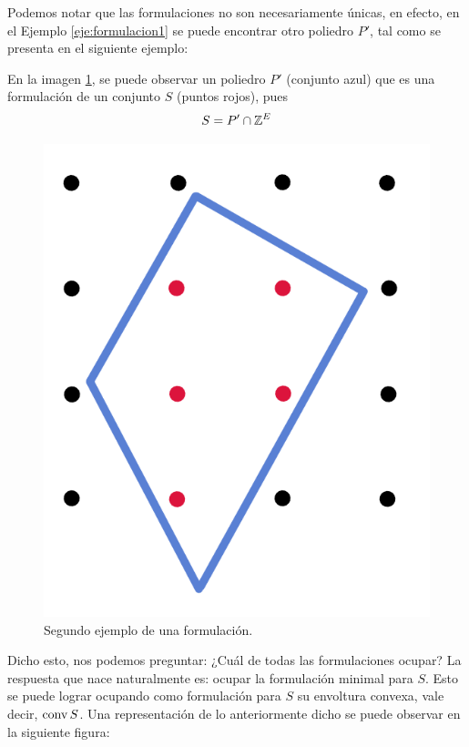 Podemos notar que las formulaciones no son necesariamente únicas, en efecto, en el Ejemplo \ref{eje:formulacion1} se puede encontrar otro poliedro $P'$, tal como se presenta en el siguiente ejemplo:

\begin{eje} \label{eje:formulacion2}
En la imagen \ref{fig:formulacion2}, se puede observar un poliedro $P'$ (conjunto azul) que es una formulación de un conjunto $S$ (puntos rojos), pues $$S = P' \cap \mathbb Z^{E}$$ 
\begin{figure}[H] 
    \centering
    \includegraphics[scale=0.3]{formulacion2.png}
    \caption{Segundo ejemplo de una formulación.}
    \label{fig:formulacion2}
\end{figure}
\end{eje}

Dicho esto, nos podemos preguntar: ¿Cuál de todas las formulaciones ocupar? La respuesta que nace naturalmente es: ocupar la formulación minimal para $S$. Esto se puede lograr ocupando como formulación para $S$ su envoltura convexa, vale decir, $\operatorname{conv} S$. Una representación de lo anteriormente dicho se puede observar en la siguiente figura:

